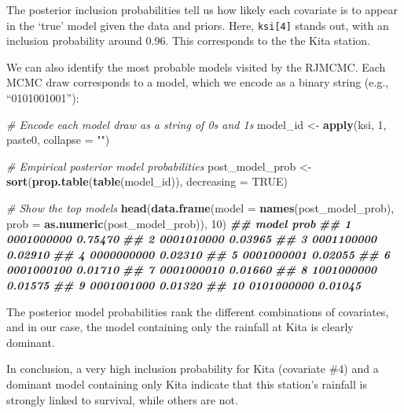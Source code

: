 \documentclass[
  12pt,
]{krantz}
\newenvironment{Shaded}{\begin{snugshade}}{\end{snugshade}}
\newcommand{\AttributeTok}[1]{\textcolor[rgb]{0.13,0.29,0.53}{#1}}
\newcommand{\CommentTok}[1]{\textcolor[rgb]{0.56,0.35,0.01}{\textit{#1}}}
\newcommand{\ConstantTok}[1]{\textcolor[rgb]{0.56,0.35,0.01}{#1}}
\newcommand{\DecValTok}[1]{\textcolor[rgb]{0.00,0.00,0.81}{#1}}
\newcommand{\DocumentationTok}[1]{\textcolor[rgb]{0.56,0.35,0.01}{\textbf{\textit{#1}}}}
\newcommand{\FunctionTok}[1]{\textcolor[rgb]{0.13,0.29,0.53}{\textbf{#1}}}
\newcommand{\NormalTok}[1]{#1}
\newcommand{\OtherTok}[1]{\textcolor[rgb]{0.56,0.35,0.01}{#1}}
\newcommand{\StringTok}[1]{\textcolor[rgb]{0.31,0.60,0.02}{#1}}
\begin{document}
The posterior inclusion probabilities tell us how likely each covariate is to appear in the `true' model given the data and priors. Here, \texttt{ksi{[}4{]}} stands out, with an inclusion probability around 0.96. This corresponds to the the Kita station.

We can also identify the most probable models visited by the RJMCMC. Each MCMC draw corresponds to a model, which we encode as a binary string (e.g., ``0101001001''):

\begin{Shaded}
\begin{Highlighting}[]
\CommentTok{\# Encode each model draw as a string of 0s and 1s}
\NormalTok{model\_id }\OtherTok{\textless{}{-}} \FunctionTok{apply}\NormalTok{(ksi, }\DecValTok{1}\NormalTok{, paste0, }\AttributeTok{collapse =} \StringTok{""}\NormalTok{)}

\CommentTok{\# Empirical posterior model probabilities}
\NormalTok{post\_model\_prob }\OtherTok{\textless{}{-}} \FunctionTok{sort}\NormalTok{(}\FunctionTok{prop.table}\NormalTok{(}\FunctionTok{table}\NormalTok{(model\_id)), }\AttributeTok{decreasing =} \ConstantTok{TRUE}\NormalTok{)}

\CommentTok{\# Show the top models}
\FunctionTok{head}\NormalTok{(}\FunctionTok{data.frame}\NormalTok{(}\AttributeTok{model =} \FunctionTok{names}\NormalTok{(post\_model\_prob), }
                \AttributeTok{prob =} \FunctionTok{as.numeric}\NormalTok{(post\_model\_prob)), }\DecValTok{10}\NormalTok{)}
\DocumentationTok{\#\#         model    prob}
\DocumentationTok{\#\# 1  0001000000 0.75470}
\DocumentationTok{\#\# 2  0001010000 0.03965}
\DocumentationTok{\#\# 3  0001100000 0.02910}
\DocumentationTok{\#\# 4  0000000000 0.02310}
\DocumentationTok{\#\# 5  0001000001 0.02055}
\DocumentationTok{\#\# 6  0001000100 0.01710}
\DocumentationTok{\#\# 7  0001000010 0.01660}
\DocumentationTok{\#\# 8  1001000000 0.01575}
\DocumentationTok{\#\# 9  0001001000 0.01320}
\DocumentationTok{\#\# 10 0101000000 0.01045}
\end{Highlighting}
\end{Shaded}

The posterior model probabilities rank the different combinations of covariates, and in our case, the model containing only the rainfall at Kita is clearly dominant.

In conclusion, a very high inclusion probability for Kita (covariate \#4) and a dominant model containing only Kita indicate that this station's rainfall is strongly linked to survival, while others are not.
\end{document}
